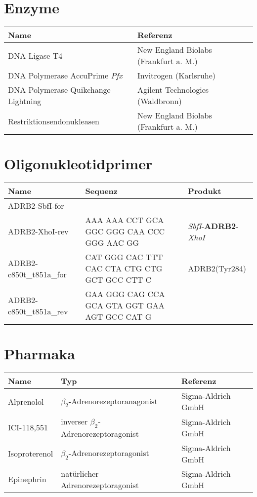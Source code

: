 \section{Enzyme}

\begin{tabularx}{\textwidth}{lll}
\toprule
Name							&	Referenz\\
\midrule
DNA Ligase T4						&	New England Biolabs (Frankfurt a. M.)\\
DNA Polymerase AccuPrime \textit{Pfx}	&	Invitrogen (Karlsruhe)\\
DNA Polymerase Quikchange Lightning	&	Agilent Technologies (Waldbronn)\\
Restriktionsendonukleasen			&	New England Biolabs (Frankfurt a. M.)\\
\bottomrule
		
\end {tabularx}


\section{Oligonukleotidprimer}

\begin{tabularx}{\textwidth}{lXl}
\toprule
Name		&	Sequenz 					&	Produkt\\
\midrule
ADRB2-SbfI-for	&&\\
ADRB2-XhoI-rev	&	AAA AAA CCT GCA GGC GGG CAA CCC GGG AAC GG	&	\textit{SbfI}-\textbf{ADRB2}-\textit{XhoI}\\
ADRB2-c850t\_t851a\_for	& 	CAT GGG CAC TTT CAC CTA CTG CTG GCT GCC CTT C & ADRB2(Tyr284)\\
ADRB2-c850t\_t851a\_rev	&	GAA GGG CAG CCA GCA GTA GGT GAA AGT GCC CAT G &\\
\bottomrule
\end{tabularx}

\section{Pharmaka}
\begin{tabularx}{\textwidth}{lll}
\toprule
Name			&	Typ										&	Referenz\\
\midrule
Alprenolol		&	$\beta_2$\--Adrenorezeptoranagonist				&	Sigma-Aldrich GmbH\\
ICI-118,551		&	inverser $\beta_2$\--Adrenorezeptoragonist		&	Sigma-Aldrich GmbH\\
Isoproterenol	&	$\beta_2$\--Adrenorezeptoragonist				&	Sigma-Aldrich GmbH\\
Epinephrin		&	natürlicher Adrenorezeptoragonist			& 	Sigma-Aldrich GmbH\\
\bottomrule
\end{tabularx}

